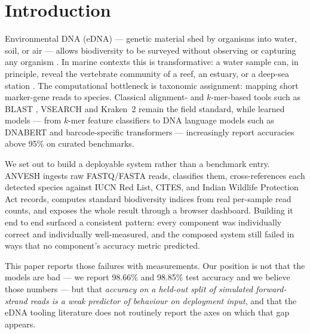 \documentclass[conference]{IEEEtran}
\begin{document}
\section{Introduction}

Environmental DNA (eDNA) --- genetic material shed by organisms into water,
soil, or air --- allows biodiversity to be surveyed without observing or
capturing any organism \cite{taberlet2012}. In marine contexts this is
transformative: a water sample can, in principle, reveal the vertebrate
community of a reef, an estuary, or a deep-sea station
\cite{deiner2017,miya2015}. The computational bottleneck is taxonomic
assignment: mapping short marker-gene reads to species. Classical
alignment- and $k$-mer-based tools such as BLAST \cite{blast}, VSEARCH
\cite{vsearch} and Kraken~2 \cite{kraken2} remain the field standard, while
learned models --- from $k$-mer feature classifiers to DNA language models
such as DNABERT \cite{dnabert} and barcode-specific transformers
\cite{barcodebert} --- increasingly report accuracies above 95\% on
curated benchmarks.

We set out to build a deployable system rather than a benchmark entry.
ANVESH ingests raw FASTQ/FASTA reads, classifies them, cross-references each
detected species against IUCN Red List, CITES, and Indian Wildlife
Protection Act records, computes standard biodiversity indices from real
per-sample read counts, and exposes the whole result through a browser
dashboard. Building it end to end surfaced a consistent pattern: every
component was individually correct and individually well-measured, and the
composed system still failed in ways that no component's accuracy metric
predicted.

This paper reports those failures with measurements. Our position is not
that the models are bad --- we report 98.66\% and 98.85\% test accuracy and
we believe those numbers --- but that \emph{accuracy on a held-out split of
simulated forward-strand reads is a weak predictor of behaviour on
deployment input}, and that the eDNA tooling literature does not routinely
report the axes on which that gap appears.
\end{document}
